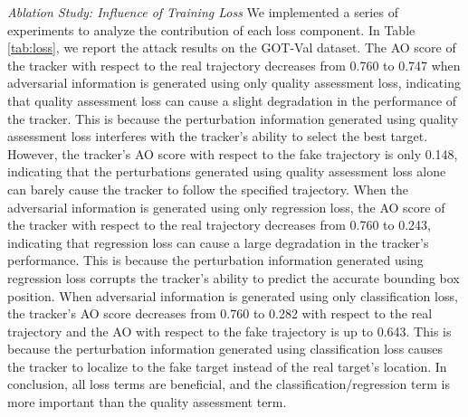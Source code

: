 \documentclass[journal]{IEEEtran}
\begin{document}
\textit{Ablation Study: Influence of Training Loss} We implemented a series of experiments to analyze the contribution of each loss component. In Table \ref{tab:loss}, we report the attack results on the GOT-Val dataset. The AO score of the tracker with respect to the real trajectory decreases from 0.760 to 0.747 when adversarial information is generated using only quality assessment loss, indicating that quality assessment loss can cause a slight degradation in the performance of the tracker. This is because the perturbation information generated using quality assessment loss interferes with the tracker's ability to select the best target. However, the tracker's AO score with respect to the fake trajectory is only 0.148, indicating that the perturbations generated using quality assessment loss alone can barely cause the tracker to follow the specified trajectory. When the adversarial information is generated using only regression loss, the AO score of the tracker with respect to the real trajectory decreases from 0.760 to 0.243, indicating that regression loss can cause a large degradation in the tracker's performance. This is because the perturbation information generated using regression loss corrupts the tracker's ability to predict the accurate bounding box position. When adversarial information is generated using only classification loss, the tracker's AO score decreases from 0.760 to 0.282 with respect to the real trajectory and the AO with respect to the fake trajectory is up to 0.643. This is because the perturbation information generated using classification loss causes the tracker to localize to the fake target instead of the real target's location. In conclusion, all loss terms are beneficial, and the classification/regression term is more important than the quality assessment term.
\end{document}
